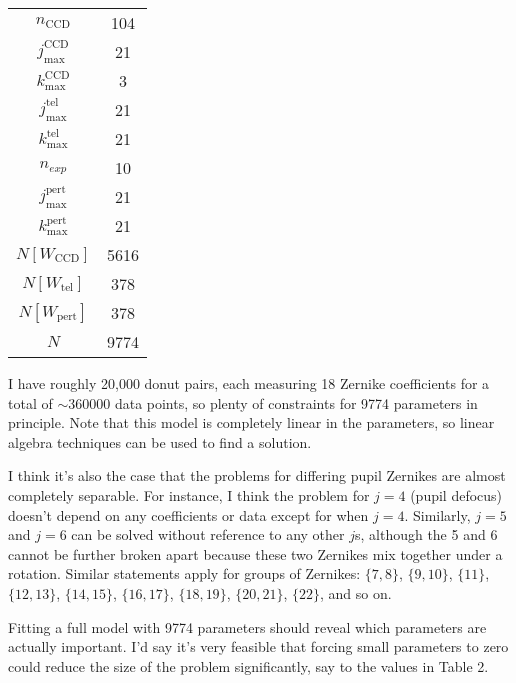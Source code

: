 \documentclass{article}
\begin{document}
\begin{table}[h]
    \center
    \label{tab:1}
    \begin{tabular}{c|c}
        \hline
        $n_\mathrm{CCD}$ & 104 \\
        $j^\mathrm{CCD}_\mathrm{max}$ & 21 \\
        $k^\mathrm{CCD}_\mathrm{max}$ & 3 \\
        $j^\mathrm{tel}_\mathrm{max}$ & 21 \\
        $k^\mathrm{tel}_\mathrm{max}$ & 21 \\
        $n_{exp}$ & 10 \\
        $j^\mathrm{pert}_\mathrm{max}$ & 21 \\
        $k^\mathrm{pert}_\mathrm{max}$ & 21 \\
        \hline
        $N[W_\mathrm{CCD}]$ & 5616 \\
        $N[W_\mathrm{tel}]$ & 378 \\
        $N[W_\mathrm{pert}]$ & 378 \\
        \hline
        $N$ & 9774
    \end{tabular}
\end{table}

I have roughly 20,000 donut pairs, each measuring 18 Zernike coefficients for a total of $\sim
360000$ data points, so plenty of constraints for 9774 parameters in principle.  Note that this
model is completely linear in the parameters, so linear algebra techniques can be used to find a
solution.

I think it's also the case that the problems for differing pupil Zernikes are almost completely
separable.  For instance, I think the problem for $j=4$ (pupil defocus) doesn't depend on any
coefficients or data except for when $j=4$.  Similarly, $j=5$ and $j=6$ can be solved without
reference to any other $j$s, although the 5 and 6 cannot be further broken apart because these two
Zernikes mix together under a rotation.  Similar statements apply for groups of Zernikes: $\{7,
8\}$, $\{9,10\}$, $\{11\}$, $\{12,13\}$, $\{14,15\}$, $\{16, 17\}$, $\{18,19\}$, $\{20, 21\}$,
$\{22\}$, and so on.

Fitting a full model with 9774 parameters should reveal which parameters are actually important. I'd
say it's very feasible that forcing small parameters to zero could reduce the size of the problem
significantly, say to the values in Table 2.
\end{document}
